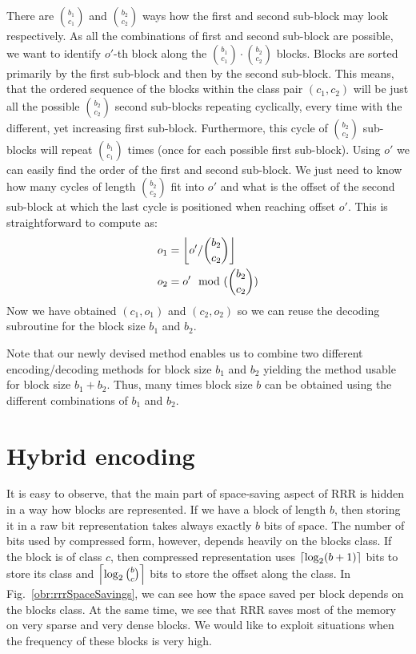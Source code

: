 There are ${b_1 \choose c_1}$ and ${b_2 \choose c_2}$ ways how the first and second
sub-block may look respectively. As all the combinations of first and second sub-block are
possible, we want to identify $o'$-th block along the ${b_1 \choose c_1}\cdot {b_2 \choose c_2}$
blocks. Blocks are sorted primarily by the first sub-block and then by the second sub-block.
This means, that the ordered sequence of the blocks within the class pair $(c_1, c_2)$ will be
just all the possible ${b_2 \choose c_2}$ second sub-blocks repeating cyclically, every time
with the different, yet increasing first sub-block. Furthermore, this cycle of
${b_2 \choose c_2}$ sub-blocks will repeat ${b_1 \choose c_1}$ times (once for each possible
first sub-block). Using $o'$ we can easily find the order of the first and second sub-block.
We just need to know how many cycles of length ${b_2 \choose c_2}$ fit into $o'$ and what is
the offset of the second sub-block at which the last cycle is positioned when reaching 
offset $o'$. This is straightforward to compute as:
\begin{align*}
    o_1 &= \floor{o'/{b_2 \choose c_2}} \\
    o_2 &= o'\mod ({b_2 \choose c_2})\\ %
\end{align*}
Now we have obtained $(c_1, o_1)$ and $(c_2, o_2)$ so we can reuse the decoding subroutine for the
block size $b_1$ and $b_2$.

Note that our newly devised method enables us to combine two different encoding/decoding methods
for block size $b_1$ and $b_2$ yielding the method usable for block size $b_1+b_2$. Thus, many
times block size $b$ can be obtained using the different combinations of $b_1$ and $b_2$.

\section{Hybrid encoding}


It is easy to observe, that the main part of space-saving aspect of RRR is hidden in
a way how blocks are represented. If we have a block of length $b$, then storing it in
a raw bit representation takes always exactly $b$ bits of space. The number of bits used by
compressed form, however, depends heavily on the blocks class. If the block is of class
$c$, then compressed representation uses $\left\lceil \log_2 (b+1) \right\rceil$ bits to store its
class and $\left\lceil \log_2{b\choose c} \right\rceil$ bits to store the offset along the class.
In Fig.~\ref{obr:rrrSpaceSavings}, we can see how the space saved per block depends on
the blocks class. At the same time, we see that RRR saves most of the memory on very
sparse and very dense blocks. We would like to exploit situations when the frequency of
these blocks is very high.


